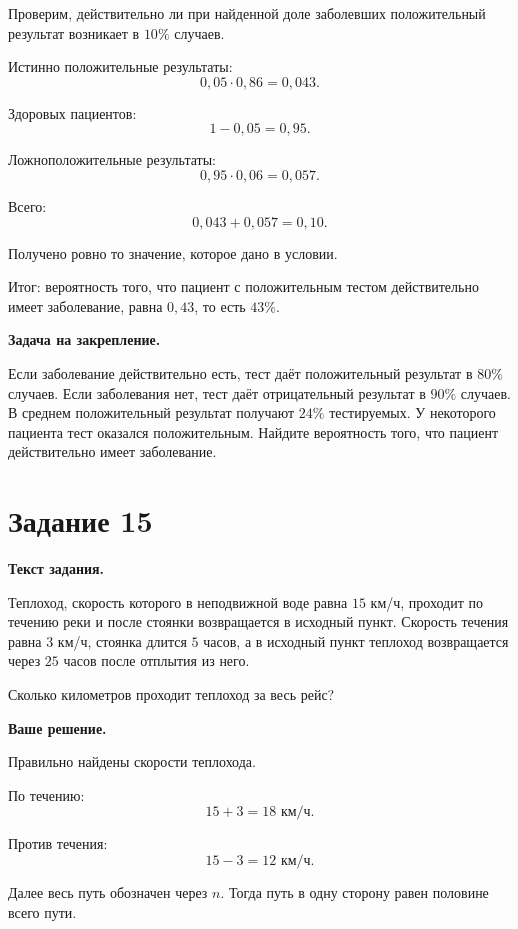 \documentclass[12pt,a4paper]{article}
\newcommand{\resultlabel}[1]{\textcolor{reviewteal!80!black}{Итог:} #1}
\begin{document}
Проверим, действительно ли при найденной доле заболевших положительный
результат возникает в $10\%$ случаев.

Истинно положительные результаты:
\[
0{,}05\cdot0{,}86=0{,}043.
\]

Здоровых пациентов:
\[
1-0{,}05=0{,}95.
\]

Ложноположительные результаты:
\[
0{,}95\cdot0{,}06=0{,}057.
\]

Всего:
\[
0{,}043+0{,}057=0{,}10.
\]

Получено ровно то значение, которое дано в условии.

\resultlabel{ вероятность того, что пациент с положительным тестом действительно имеет заболевание, равна $0{,}43$, то есть $43\%$.}

\textbf{Задача на закрепление.}

Если заболевание действительно есть, тест даёт положительный результат
в $80\%$ случаев. Если заболевания нет, тест даёт отрицательный результат
в $90\%$ случаев. В среднем положительный результат получают $24\%$
тестируемых. У некоторого пациента тест оказался положительным.
Найдите вероятность того, что пациент действительно имеет заболевание.


\newpage
{}
\label{task:15}

\section*{Задание 15}

\textbf{Текст задания.}

Теплоход, скорость которого в неподвижной воде равна $15$ км/ч,
проходит по течению реки и после стоянки возвращается в исходный пункт.
Скорость течения равна $3$ км/ч, стоянка длится $5$ часов, а в исходный
пункт теплоход возвращается через $25$ часов после отплытия из него.

Сколько километров проходит теплоход за весь рейс?

\textbf{Ваше решение.}

Правильно найдены скорости теплохода.

По течению:
\[
15+3=18\text{ км/ч}.
\]

Против течения:
\[
15-3=12\text{ км/ч}.
\]

Далее весь путь обозначен через $n$. Тогда путь в одну сторону равен
половине всего пути.
\end{document}
